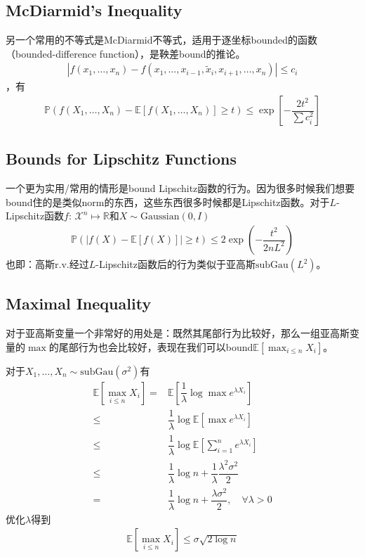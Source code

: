 \documentclass[11pt,a4paper]{ctexart}
\numberwithin{equation}{section}%
\begin{document}
\subsection{McDiarmid's Inequality}
另一个常用的不等式是McDiarmid不等式，适用于逐坐标bounded的函数（bounded-difference function），是鞅差bound的推论。
\begin{align*}
    \left\vert f(x_1,\ldots,x_n) - f(x_1,\ldots,x_{i-1},\tilde{x}_i, x_{i+1},\ldots, x_n) \right\vert  \leq c_i
\end{align*}
，有
\begin{align*}
    \mathbb{P}\left( f(X_1,\ldots,X_n) - \mathbb{E}\left[ f(X_1,\ldots,X_n) \right] \geq t \right) \leq \exp\left[ -\dfrac{ 2 t^2}{\sum c_i^2}  \right]
\end{align*}


\subsection{Bounds for Lipschitz Functions}
一个更为实用/常用的情形是bound Lipschitz函数的行为。因为很多时候我们想要bound住的是类似norm的东西，这些东西很多时候都是Lipschitz函数。对于$ L $-Lipschitz函数$ f:\, \mathcal{X}^n\mapsto \mathbb{R} $和$ X\sim \mathrm{ Gaussian }(0,I)  $
\begin{align*}
    \mathbb{P}\left( \left\vert f(X)-\mathbb{E}\left[ f(X) \right]  \right\vert \geq t \right) \leq 2\exp\left( -\dfrac{ t^2 }{ 2nL^2 } \right)
\end{align*}
也即：高斯r.v.经过$ L $-Lipschitz函数后的行为类似于亚高斯$ \mathrm{subGau}(L^2) $。



\subsection{Maximal Inequality}
对于亚高斯变量一个非常好的用处是：既然其尾部行为比较好，那么一组亚高斯变量的$ \max $的尾部行为也会比较好，表现在我们可以bound$ \mathbb{E}\left[ \max_{i\leq n} X_i \right]  $。

对于$ X_1,\ldots,X_n \sim \mathrm{ subGau }(\sigma ^2)  $有
\begin{align*}
    \mathbb{E}\left[ \max_{i\leq n} X_i \right] =& \mathbb{E}\left[  \dfrac{ 1 }{ \lambda  } \log\max e^{\lambda X_i} \right] \\
    \leq & \dfrac{ 1 }{ \lambda  } \log \mathbb{E}\left[ \max e^{\lambda  X_i} \right] \\
    \leq & \dfrac{ 1 }{ \lambda  } \log  \mathbb{E}\left[ \sum_{i=1}^n e^{\lambda  X_i} \right] \\
    \leq & \dfrac{ 1 }{ \lambda  } \log n + \dfrac{ 1 }{ \lambda  } \dfrac{ \lambda ^2 \sigma ^2 }{ 2 }\\
    =& \dfrac{ 1 }{ \lambda  } \log n + \dfrac{ \lambda \sigma ^2 }{ 2 },\quad \forall \lambda > 0
\end{align*}
优化$ \lambda $得到
\begin{align*}
    \mathbb{E}\left[ \max_{i\leq n} X_i \right] \leq \sigma \sqrt{ 2\log n } 
\end{align*}
\end{document}
